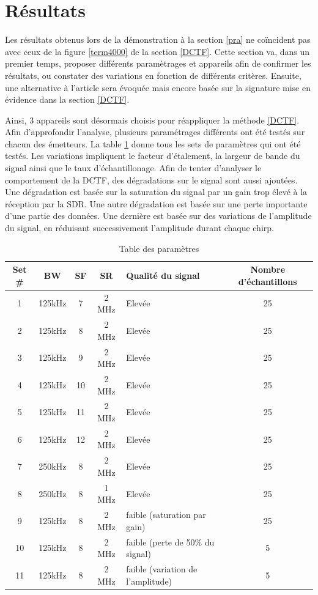 \newpage

\section{Résultats}\label{result}

Les résultats obtenus lors de la démonstration à la section  \ref{pra} ne coïncident pas avec ceux de la figure \ref{term4000} de la section \ref{DCTF}. Cette section va, dans un premier temps, proposer différents paramètrages et appareils afin de confirmer les résultats, ou constater des variations en fonction de différents critères. Ensuite, une alternative à l'article sera évoquée mais encore basée sur la signature mise en évidence dans la section \ref{DCTF}. 

Ainsi, 3 appareils sont désormais choisis pour réappliquer la méthode \ref{DCTF}. Afin d'approfondir l'analyse, plusieurs paramétrages différents ont été testés sur chacun des émetteurs. La table \ref{set} donne tous les sets de paramètres qui ont été testés. Les variations impliquent le facteur d'étalement, la largeur de bande du signal ainsi que le taux d'échantillonage. Afin de tenter d'analyser le comportement de la \ac{DCTF}, des dégradations sur le signal sont aussi ajoutées. Une dégradation est basée sur la saturation du signal par un gain trop élevé à la réception par la \ac{SDR}. Une autre dégradation est basée sur une perte importante d'une partie des données. Une dernière est basée sur des variations de l'amplitude du signal, en réduisant successivement l'amplitude durant chaque chirp.

\begin{table}[h]
\centering
\begin{tabular}{|c|c|c|c|p{3cm}|c|}
\hline
Set \# & BW & SF & SR & Qualité du signal & Nombre d'échantillons\\
\hline
1  & 125kHz & 7 & 2 MHz & Elevée & 25\\
\hline
2  & 125kHz & 8 & 2 MHz & Elevée & 25\\
\hline
3  & 125kHz & 9 & 2 MHz & Elevée & 25\\
\hline
4  & 125kHz & 10 & 2 MHz & Elevée & 25\\
\hline
5  & 125kHz & 11 & 2 MHz & Elevée & 25\\
\hline
6  & 125kHz & 12 & 2 MHz & Elevée & 25\\
\hline
7  & 250kHz & 8 & 2 MHz & Elevée & 25\\
\hline
8  & 250kHz & 8 & 1 MHz & Elevée & 25\\
\hline
9  &  125kHz & 8 & 2 MHz & faible (saturation par gain) & 25\\
\hline
10  & 125kHz & 8 & 2 MHz & faible (perte de 50\% du signal) & 5\\
\hline
11  & 125kHz & 8 & 2 MHz & faible (variation de l'amplitude) & 5\\
\hline
\end{tabular}
\caption{Table des paramètres}
\label{set}
\end{table}

